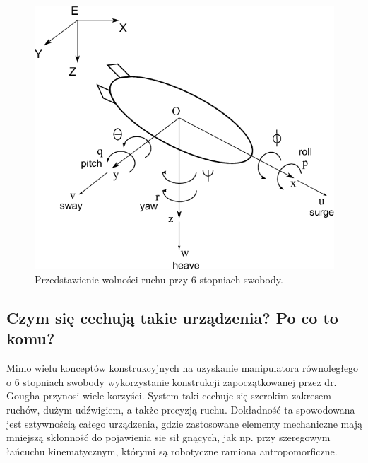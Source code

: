 \begin{figure}[!h]
    \label{fig:anzelm}
    \centering
    \includegraphics[width=0.5\linewidth]{img/6-DOF-reaserchgate.png}
    \caption{Przedstawienie wolności ruchu przy 6 stopniach swobody.}
\end{figure}


\subsection{Czym się cechują takie urządzenia? Po co to komu?}

Mimo wielu konceptów konstrukcyjnych na uzyskanie manipulatora równoległego o 6 stopniach swobody wykorzystanie konstrukcji zapoczątkowanej przez dr. Gougha przynosi wiele korzyści. 
System taki cechuje się szerokim zakresem ruchów, dużym udźwigiem, a także precyzją ruchu. Dokładność ta spowodowana jest sztywnością całego urządzenia, gdzie zastosowane elementy mechaniczne mają mniejszą skłonność do pojawienia sie sił gnących, jak np. przy szeregowym łańcuchu kinematycznym, którymi są robotyczne ramiona antropomorficzne.





